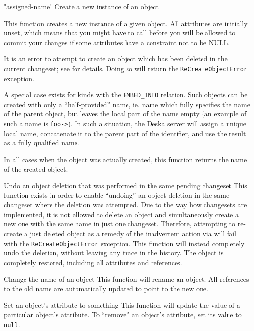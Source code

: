 \documentclass[deska]{subfiles}
\begin{document}
    {"assigned-name"}
    {Create a new instance of an object}
    {This function creates a new instance of a given object.  All attributes are initially unset, which means that you
    might have to call  before you will be allowed to commit your changes if some attributes
    have a constraint not to be NULL.

    It is an error to attempt to create an object which has been deleted in the current changeset; see
     for details.  Doing so will return the {\tt ReCreateObjectError} exception.

    A special case exists for kinds with the {\tt EMBED\_INTO} relation. Such objects can be created with only a
    ``half-provided'' name, ie. name which fully specifies the name of the parent object, but leaves the local part of
    the name empty (an example of such a name is {\tt foo->}).  In such a situation, the Deska server will assign a
    unique local name, concatenate it to the parent part of the identifier, and use the result as a fully qualified
    name.

    In all cases when the object was actually created, this function returns the name of the created object.}

    {}
    {Undo an object deletion that was performed in the same pending changeset}
    {This function exists in order to enable ``undoing'' an object deletion in the same changeset where the deletion was
    attempted.  Due to the way how changesets are implemented, it is not allowed to delete an object and simultaneously
    create a new one with the same name in just one changeset.  Therefore, attempting to re-create a just deleted object
    as a remedy of the inadvertent action via  will fail with the {\tt ReCreateObjectError}
    exception.  This function will instead completely undo the deletion, without leaving any trace in the history.  The
    object is completely restored, including all attributes and references.}

    {}
    {Change the name of an object}
    {This function will rename an object.  All references to the old name are automatically updated to point to the new
    one.}

    {}
    {Set an object's attribute to something}
    {This function will update the value of a particular object's attribute.  To ``remove'' an object's attribute, set its
    value to {\tt null}.}
\end{document}
